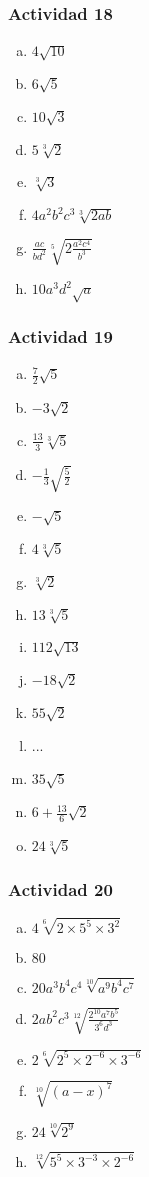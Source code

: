\documentclass[a4paper, twocolumn]{article}
\begin{document}
\subsubsection*{Actividad 18}
\begin{enumerate}[a)]
\item $4\sqrt{10}$
\item $6\sqrt{5}$
\item $10\sqrt{3}$
\item $5\sqrt[3]{2}$
\item $\sqrt[3]{3}$
\item $4a^2b^2c^3\sqrt[3]{2ab}$
\item $\frac{ac}{bd^2}\sqrt[5]{2\frac{a^2c^4}{b^3}}$
\item $10a^3 d^2\sqrt{a}$
\end{enumerate}

\subsubsection*{Actividad 19}
\begin{enumerate}[a)]
\item $\frac{7}{2}\sqrt{5}$
\item $-3\sqrt{2}$
\item $\frac{13}{3}\sqrt[3]{5}$
\item $-\frac{1}{3}\sqrt{\frac{5}{2}}$
\item $-\sqrt{5}$
\item $4\sqrt[3]{5}$
\item $\sqrt[3]{2}$
\item $13\sqrt[3]{5}$
\item $112\sqrt{13}$
\item $-18\sqrt{2}$
\item $55\sqrt{2}$
\item ...
\item $35\sqrt{5}$
\item $6 + \frac{13}{6}\sqrt{2}$
\item $24\sqrt[3]{5}$
\end{enumerate}

\subsubsection*{Actividad 20}
\begin{enumerate}[a)]
\item $4\sqrt[6]{2\times5^{5}\times3^2}$
\item $80$
\item $20a^3b^4c^4\sqrt[10]{a^9b^4c^7}$
\item $2ab^2c^3\sqrt[12]{\frac{2^{10} a^7 b^5}{3^6 d^3}}$
\item $2\sqrt[6]{2^5\times2^{-6}\times3^{-6}}$
\item $\sqrt[10]{(a-x)^7}$
\item $24\sqrt[10]{2^9}$
\item $\sqrt[12]{{5^5}\times3^{-3}\times2^{-6}}$
\end{enumerate}
\end{document}
